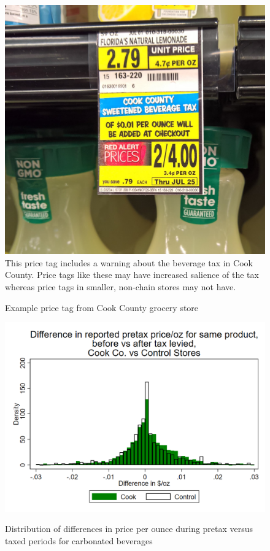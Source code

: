 \documentclass[12pt]{article}
\begin{document}
\begin{figure}[t]\centering
  \caption{Example price tag from Cook County grocery store} \label{pricetag}
	\includegraphics[width = \textwidth]{../figures/pricetag.jpg}
	\footnotesize This price tag includes a warning about the beverage tax in Cook County. Price tags like these may have increased salience of the tax whereas price tags in smaller, non-chain stores may not have.
\end{figure}

\clearpage
\begin{figure}[t]\centering
	\includegraphics[width = \textwidth]{../figures/ppozdiff.png}\label{pricediff}
	\caption{Distribution of differences in price per ounce during pretax versus taxed periods for carbonated beverages}
\end{figure}
\end{document}
